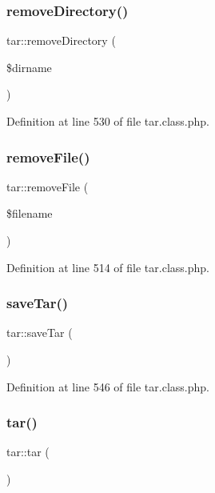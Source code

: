 \subsubsection{\texorpdfstring{remove\+Directory()}{removeDirectory()}}
{\footnotesize\ttfamily tar\+::remove\+Directory (\begin{DoxyParamCaption}\item[{}]{\$dirname }\end{DoxyParamCaption})}



Definition at line 530 of file tar.\+class.\+php.

\mbox{\label{classtar_a51cd4b11f9e4e6c9c5c0bc93d5a063c7}} 
\subsubsection{\texorpdfstring{remove\+File()}{removeFile()}}
{\footnotesize\ttfamily tar\+::remove\+File (\begin{DoxyParamCaption}\item[{}]{\$filename }\end{DoxyParamCaption})}



Definition at line 514 of file tar.\+class.\+php.

\mbox{\label{classtar_ac70edc9fc85a3106aaa3c07a3a57a0a2}} 
\subsubsection{\texorpdfstring{save\+Tar()}{saveTar()}}
{\footnotesize\ttfamily tar\+::save\+Tar (\begin{DoxyParamCaption}{ }\end{DoxyParamCaption})}



Definition at line 546 of file tar.\+class.\+php.

\mbox{\label{classtar_a310c3cc3417ea0fdb5c1c96cc5b47efa}} 
\subsubsection{\texorpdfstring{tar()}{tar()}}
{\footnotesize\ttfamily tar\+::tar (\begin{DoxyParamCaption}{ }\end{DoxyParamCaption})}



